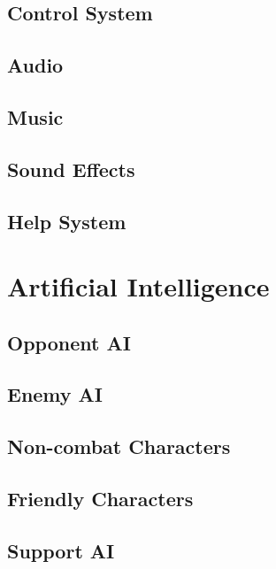 \documentclass[12pt,titlepage]{article}
\begin{document}
\subsection{Control System}

\subsection{Audio}

\subsection{Music}

\subsection{Sound Effects}

\subsection{Help System}

\newpage
\section{Artificial Intelligence}

\subsection{Opponent AI}

\subsection{Enemy AI}

\subsection{Non-combat Characters}

\subsection{Friendly Characters}

\subsection{Support AI}
\end{document}
